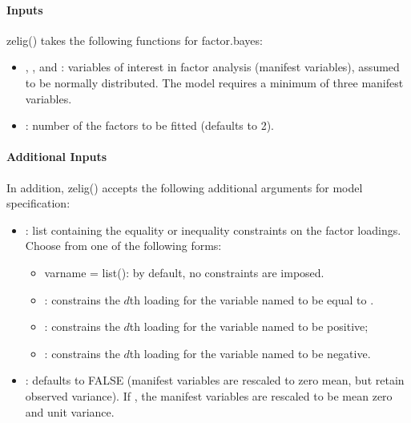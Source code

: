 \documentclass[letterpaper,10pt,english]{sphinxmanual}
\begin{document}
\paragraph{Inputs}
\label{zelig-factorbayes:inputs}
zelig() takes the following functions for factor.bayes:
\begin{itemize}
\item {} 
, , and : variables of interest in factor analysis
(manifest variables), assumed to be normally distributed. The model
requires a minimum of three manifest variables.

\item {} 
: number of the factors to be fitted (defaults to 2).

\end{itemize}


\paragraph{Additional Inputs}
\label{zelig-factorbayes:additional-inputs}
In addition, zelig() accepts the following additional arguments for
model specification:
\begin{itemize}
\item {} 
: list containing the equality or inequality
constraints on the factor loadings. Choose from one of the following
forms:
\begin{itemize}
\item {} 
varname = list(): by default, no constraints are imposed.

\item {} 
: constrains the \(d\)th loading for
the variable named  to be equal to .

\item {} 
: constrains the \(d\)th loading for
the variable named  to be positive;

\item {} 
: constrains the \(d\)th loading for
the variable named  to be negative.

\end{itemize}

\item {} 
: defaults to FALSE (manifest variables are rescaled to
zero mean, but retain observed variance). If , the manifest
variables are rescaled to be mean zero and unit variance.

\end{itemize}
\end{document}
